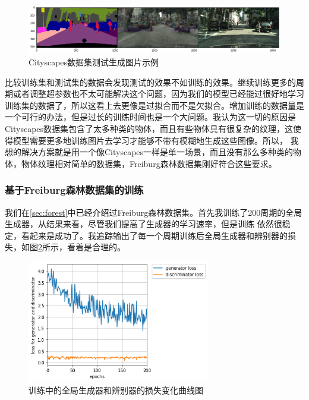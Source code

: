 \documentclass[supercite]{HustGraduPaper}
\theoremstyle{definition}
\begin{document}
\begin{figure}[H]
  \begin{center}
  \includegraphics[width=14cm]{images/cityscapes-test}
  \end{center}
  \caption{Cityscapes数据集测试生成图片示例}
  \label{fig:Cityscapes-test}
\end{figure}

比较训练集和测试集的数据会发现测试的效果不如训练的效果。继续训练更多的周期或者调整超参数也不太可能解决这个问题，因为我们的模型已经能过很好地学习
训练集的数据了，所以这看上去更像是过拟合而不是欠拟合。增加训练的数据量是一个可行的办法，但是过长的训练时间也是一个大问题。我认为这一切的原因是
Cityscapes数据集包含了太多种类的物体，而且有些物体具有很复杂的纹理，这使得模型需要更多地训练图片去学习才能够不带有模糊地生成这些图像。所以，
我想的解决方案就是用一个像Cityscapes一样是单一场景，而且没有那么多种类的物体，物体纹理相对简单的数据集，Freiburg森林数据集刚好符合这些要求。

\subsubsection{基于Freiburg森林数据集的训练}

我们在\ref{sec:forest}中已经介绍过Freiburg森林数据集。首先我训练了200周期的全局生成器，从结果来看，尽管我们提高了生成器的学习速率，但是训练
依然很稳定，看起来是成功了。我追踪输出了每一个周期训练后全局生成器和辨别器的损失，如图\ref{fig:global-generator-loss}所示，看着是合理的。
\begin{figure}[H]
  \begin{center}
  \includegraphics[width=8cm]{images/global-generator-loss}
  \end{center}
  \caption{训练中的全局生成器和辨别器的损失变化曲线图}
  \label{fig:global-generator-loss}
\end{figure}
\end{document}
